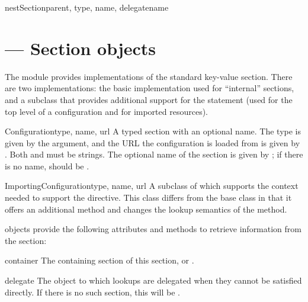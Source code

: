 \documentclass{howto}
\begin{document}
\begin{methoddesc}{nestSection}{parent, type, name, delegatename}
\end{methoddesc}


\section{ --- Section objects}



The  module provides implementations of the
standard key-value section.  There are two implementations: the basic
implementation used for ``internal'' sections, and a subclass that
provides additional support for the  statement (used
for the top level of a configuration and for imported resources).

\begin{classdesc}{Configuration}{type, name, url}
  A typed section with an optional name.  The type is given by the
   argument, and the URL the configuration is loaded from is
  given by .  Both  and  must be strings.
  The optional name of the section is given by ; if there is
  no name,  should be .
\end{classdesc}

\begin{classdesc}{ImportingConfiguration}{type, name, url}
  A subclass of  which supports the context
  needed to support the  directive.  This class
  differs from the base class in that it offers an additional method
  and changes the lookup semantics of the  method.
\end{classdesc}

 objects provide the following attributes and
methods to retrieve information from the section:

\begin{memberdesc}[Configuration]{container}
  The containing section of this section, or .
\end{memberdesc}

\begin{memberdesc}[Configuration]{delegate}
  The  object to which lookups are delegated when
  they cannot be satisfied directly.  If there is no such section,
  this will be .
\end{memberdesc}
\end{document}
